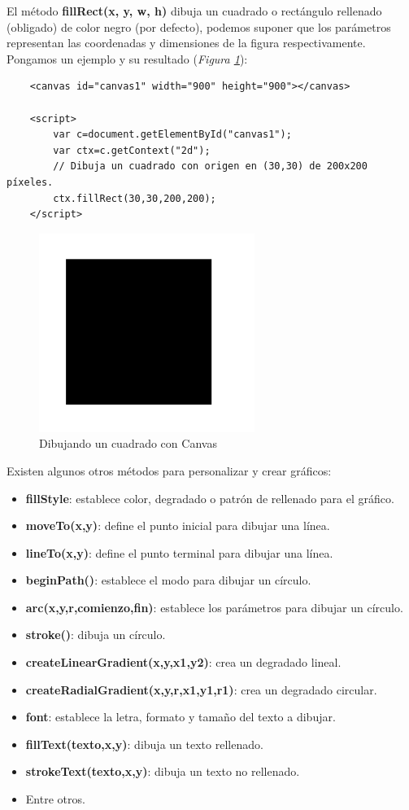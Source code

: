El método \textbf{fillRect(x, y, w, h)} dibuja un cuadrado o rectángulo rellenado (obligado) de color negro (por defecto), podemos suponer que los parámetros representan las coordenadas y dimensiones de la figura respectivamente. Pongamos un ejemplo y su resultado (\textit{Figura \ref{fig: 27}}):
\begin{lstlisting}
    <canvas id="canvas1" width="900" height="900"></canvas>
        
    <script>
        var c=document.getElementById("canvas1");
        var ctx=c.getContext("2d");
        // Dibuja un cuadrado con origen en (30,30) de 200x200 píxeles.
        ctx.fillRect(30,30,200,200);
    </script>
\end{lstlisting}
\begin{figure}[H]
    \centering
    \caption{Dibujando un cuadrado con Canvas}
    \label{fig: 27}
    \includegraphics[width=7cm]{ss_html/canvas.png}
\end{figure}

Existen algunos otros métodos para personalizar y crear gráficos:
\begin{itemize}
    \item \textbf{fillStyle}: establece color, degradado o patrón de rellenado para el gráfico.
    \item \textbf{moveTo(x,y)}: define el punto inicial para dibujar una línea.
    \item \textbf{lineTo(x,y)}: define el punto terminal para dibujar una línea.
    \item \textbf{beginPath()}: establece el modo para dibujar un círculo.
    \item \textbf{arc(x,y,r,comienzo,fin)}: establece los parámetros para dibujar un círculo.
    \item \textbf{stroke()}: dibuja un círculo.
    \item \textbf{createLinearGradient(x,y,x1,y2)}: crea un degradado lineal.
    \item \textbf{createRadialGradient(x,y,r,x1,y1,r1)}: crea un degradado circular.
    \item \textbf{font}: establece la letra, formato y tamaño del texto a dibujar.
    \item \textbf{fillText(texto,x,y)}: dibuja un texto rellenado.
    \item \textbf{strokeText(texto,x,y)}: dibuja un texto no rellenado.
    \item Entre otros.
\end{itemize}


